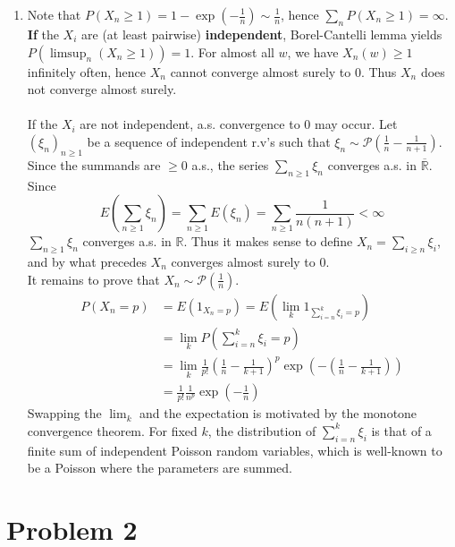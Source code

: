 \documentclass[a4paper,11pt]{article}
\begin{document}
\begin{enumerate}
\begin{enumerate}
    \item Note that $P(X_n\geq 1) = 1-\exp(-\frac 1n)\sim \frac 1n$, hence $\sum_n P(X_n\geq 1) = \infty$.\\
    \textbf{If} the $X_i$ are (at least pairwise) \textbf{independent}, Borel-Cantelli lemma yields \\
    $P\left(\limsup_n \left(X_n\geq 1\right)\right)=1$. For almost all $w$, we have $X_n(w)\geq 1$ infinitely often, hence $X_n$ cannot converge almost surely to $0$. Thus $X_n$ does not converge almost surely.\\\\
    If the $X_i$ are not independent, a.s. convergence to $0$ may occur. Let $(\xi_n)_{n\geq 1}$ be a sequence of independent r.v's such that $\xi_n \sim \mathcal P(\frac{1}{n}-\frac{1}{n+1})$. Since the summands are $\geq 0$ a.s., the series $\sum_{n\geq 1} \xi_n$ converges a.s. in $\overline{\mathbb R}$. Since $$E\left(\sum_{n\geq 1} \xi_n\right) = \sum_{n\geq 1} E(\xi_n ) = \sum_{n\geq 1} \frac{1}{n(n+1)} <\infty$$ $\sum_{n\geq 1} \xi_n$ converges a.s. in $\mathbb R$.
    Thus it makes sense to define $X_n=\sum_{i\geq n} \xi_i$, and by what precedes $X_n$ converges almost surely to $0$.\\
    It remains to prove that $X_n\sim \mathcal P(\frac 1n)$. 
    $$\begin{aligned}P(X_n=p) &= E(1_{X_n=p}) =  E(\lim_k1_{\sum_{i=n}^k\xi_i=p})\\
&= \lim_k P(\sum_{i=n}^k\xi_i=p)\\
&= \lim_k \frac{1}{p!}\left(\frac 1n - \frac 1{k+1}\right)^p \exp\left(-(\frac 1n - \frac 1{k+1})\right) \\
&= \frac{1}{p!}\frac 1{n^p} \exp(-\frac 1n)
\end{aligned}$$
    Swapping the $\lim_k$ and the expectation is motivated by the monotone convergence theorem. For fixed $k$, the distribution of $\sum_{i=n}^k\xi_i$ is that of a finite sum of independent Poisson random variables, which is well-known to be a Poisson where the parameters are summed.
    \end{enumerate}
  
\end{enumerate}

\section*{Problem 2}
\noindent{}
\end{document}
